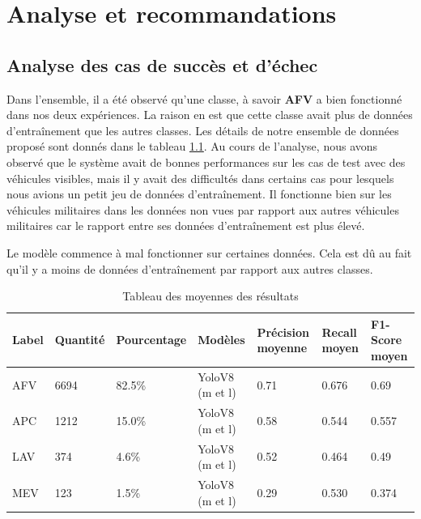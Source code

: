 \chapter{Analyse et recommandations}
\label{chap:4}
\sloppy

\section{Analyse des cas de succès et d'échec}

Dans l'ensemble, il a été observé qu'une classe, à savoir \textbf{AFV}  a bien fonctionné dans nos deux expériences.
La raison en est que cette classe avait plus de données d'entraînement que les autres classes.
Les détails de notre ensemble de données proposé sont donnés dans le tableau \ref{tab:label_data}.
Au cours de l'analyse, nous avons observé que le système avait de bonnes performances sur les cas de test avec des véhicules visibles, mais il y avait des difficultés dans certains cas pour lesquels nous avions un petit jeu de données d'entraînement.
Il fonctionne bien sur les véhicules militaires dans les données non vues par rapport aux autres véhicules militaires car le rapport entre ses données d'entraînement est plus élevé.

Le modèle commence à mal fonctionner sur certaines données. Cela est dû au fait qu'il y a moins de données d'entraînement par rapport aux autres classes.

\begin{table}[H]
    \centering
    \begin{tabular}{|l|l|l|p{2.8cm}|p{2cm}|p{2cm}|p{2cm}|}
        \hline
        \textbf{Label} & \textbf{Quantité} & \textbf{Pourcentage} & \textbf{Modèles} & \textbf{Précision moyenne} & \textbf{Recall moyen} & \textbf{F1-Score moyen} \\ \hline
        AFV            & 6694              & 82.5\%               & YoloV8 (m et l)  & 0.71                       & 0.676                 & 0.69                    \\ \hline
        APC            & 1212              & 15.0\%               & YoloV8 (m et l)  & 0.58                       & 0.544                 & 0.557                   \\ \hline
        LAV            & 374               & 4.6\%                & YoloV8 (m et l)  & 0.52                       & 0.464                 & 0.49                    \\ \hline
        MEV            & 123               & 1.5\%                & YoloV8 (m et l)  & 0.29                       & 0.530                 & 0.374                   \\ \hline
    \end{tabular}
    \caption{Tableau des moyennes des résultats}
    \label{tab:label_data}
\end{table}


